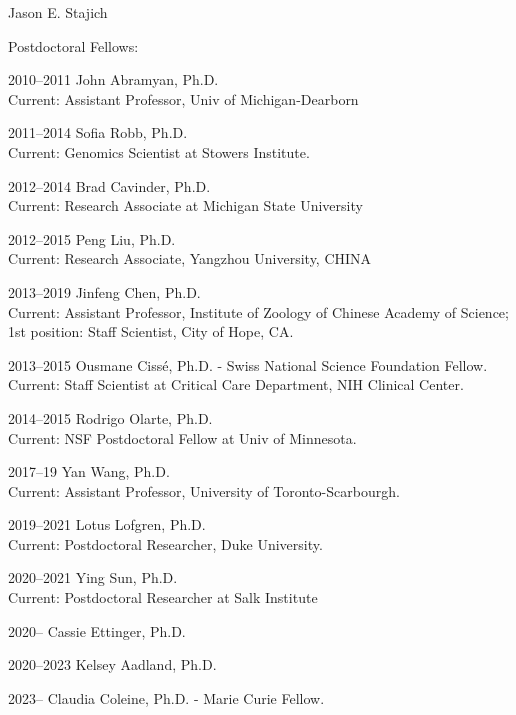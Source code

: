\documentclass[10pt]{article}
\begin{document}
\begin{cv}{\centerline{Jason E. Stajich}}
\begin{cvlistcompact}{Postdoctoral Fellows:}
\item [2010--2011] John Abramyan, Ph.D. \\
  Current: Assistant Professor, Univ of Michigan-Dearborn
\item [2011--2014] Sofia Robb, Ph.D. \\
  Current: Genomics Scientist at Stowers Institute.
\item [2012--2014] Brad Cavinder, Ph.D. \\
  Current: Research Associate at Michigan State University
\item [2012--2015] Peng Liu, Ph.D. \\
  Current: Research Associate, Yangzhou University, CHINA
\item [2013--2019] Jinfeng Chen, Ph.D. \\
Current: Assistant Professor, Institute of Zoology of Chinese Academy of Science; 1st position: Staff Scientist, City of Hope, CA.
\item [2013--2015] Ousmane Ciss\'{e}, Ph.D. - Swiss National Science Foundation Fellow. \\
  Current: Staff Scientist at Critical Care Department, NIH Clinical Center.
\item [2014--2015] Rodrigo Olarte, Ph.D. \\
  Current: NSF Postdoctoral Fellow at Univ of Minnesota.
\item [2017--19] Yan Wang, Ph.D. \\
  Current: Assistant Professor, University of Toronto-Scarbourgh.
\item [2019--2021] Lotus Lofgren, Ph.D. \\
  Current: Postdoctoral Researcher, Duke University.
\item [2020--2021] Ying Sun, Ph.D. \\
Current: Postdoctoral Researcher at Salk Institute
\item [2020--] Cassie Ettinger, Ph.D.
\item [2020--2023] Kelsey Aadland, Ph.D.
\item [2023--] Claudia Coleine, Ph.D. - Marie Curie Fellow.
\end{cvlistcompact}


\end{cv}
\end{document}
